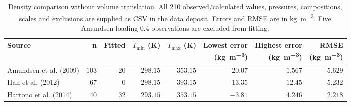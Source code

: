 \begin{table}[!htbp]\small\setlength{\tabcolsep}{3pt}\centering
\caption{Density comparison without volume translation. All 210 observed/calculated values, pressures, compositions, scales and exclusions are supplied as CSV in the data deposit. Errors and RMSE are in \si{\kilogram\per\cubic\metre}. Five Amundsen loading-0.4 observations are excluded from fitting.}\label{tab:supplement-carbonate-density}
\begin{tabular}{@{}lrrrrrrr@{}}
\toprule
Source & n & Fitted & $T_{\min}$ (K) & $T_{\max}$ (K) & \makecell[rb]{Lowest error\\(\si{\kilogram\per\cubic\metre})} & \makecell[rb]{Highest error\\(\si{\kilogram\per\cubic\metre})} & \makecell[rb]{RMSE\\(\si{\kilogram\per\cubic\metre})} \\
\midrule
Amundsen et al. (2009) & $103$ & $20$ & $298.15$ & $353.15$ & $-20.07$ & $1.567$ & $5.629$ \\
Han et al. (2012) & $67$ & $0$ & $298.15$ & $393.15$ & $-13.35$ & $12.45$ & $5.232$ \\
Hartono et al. (2014) & $40$ & $32$ & $293.15$ & $353.15$ & $-3.81$ & $4.246$ & $2.218$ \\
\bottomrule
\end{tabular}
\end{table}
